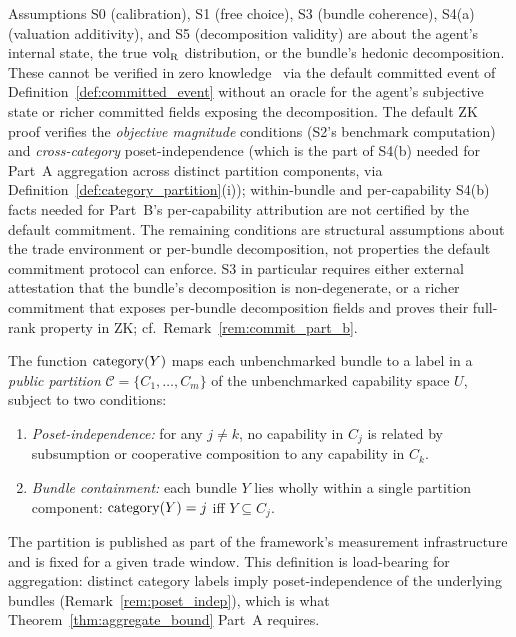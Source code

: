 \begin{remark}
\label{rem:zk_limits}
Assumptions S0 (calibration), S1 (free choice), S3 (bundle
coherence), S4(a) (valuation additivity), and S5 (decomposition
validity) are about the agent's internal state, the true
${\operatorname{vol}_{\mathrm{R}}}$ distribution, or the bundle's hedonic decomposition.
These cannot be verified in zero
knowledge~\citep{goldwasser1985knowledge} via the default
committed event of Definition~\ref{def:committed_event} without
an oracle for the agent's subjective state or richer committed
fields exposing the decomposition.  The default ZK proof
verifies the \emph{objective magnitude} conditions (S2's
benchmark computation) and \emph{cross-category}
poset-independence (which is the part of S4(b) needed for
Part~A aggregation across distinct partition components, via
Definition~\ref{def:category_partition}(i)); within-bundle and
per-capability S4(b) facts needed for Part~B's per-capability
attribution are not certified by the default commitment.  The
remaining conditions are structural
assumptions about the trade environment or per-bundle
decomposition, not properties the default commitment protocol
can enforce.  S3 in particular requires either external
attestation that the bundle's decomposition is
non-degenerate, or a richer commitment that exposes per-bundle
decomposition fields and proves their full-rank property in
ZK; cf.\ Remark~\ref{rem:commit_part_b}.
\end{remark}

\begin{definition}
\label{def:category_partition}
The function $\mathrm{category}(Y)$ maps each unbenchmarked bundle to a label in
a \emph{public partition}
$\mathcal{C} = \{C_1, \ldots, C_m\}$ of the unbenchmarked
capability space $U$, subject to two conditions:
\begin{enumerate}
\item[(i)] \emph{Poset-independence:} for any $j \neq k$, no
  capability in $C_j$ is related by subsumption or cooperative
  composition to any capability in $C_k$.
\item[(ii)] \emph{Bundle containment:} each bundle $Y$ lies
  wholly within a single partition component:
  $\mathrm{category}(Y) = j$ iff $Y \subseteq C_j$.
\end{enumerate}
The partition is published as part of the framework's measurement
infrastructure and is fixed for a given trade window.  This
definition is load-bearing for aggregation: distinct category
labels imply poset-independence of the underlying bundles
(Remark~\ref{rem:poset_indep}), which is what
Theorem~\ref{thm:aggregate_bound} Part~A requires.
\end{definition}

